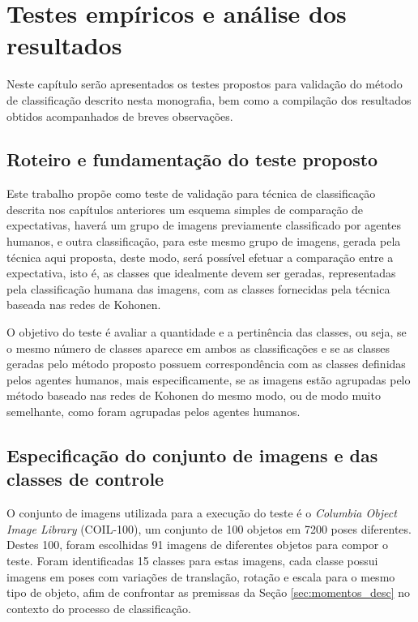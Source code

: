 \chapter{Testes empíricos e análise dos resultados}

Neste capítulo serão apresentados os testes propostos para validação do método
de classificação descrito nesta monografia, bem como a compilação dos
resultados obtidos acompanhados de breves observações.

\section{Roteiro e fundamentação do teste proposto}

Este trabalho propõe como teste de validação para técnica de classificação
descrita nos capítulos anteriores um esquema simples de comparação de
expectativas, haverá um grupo de imagens previamente classificado por agentes
humanos, e outra classificação, para este mesmo grupo de imagens, gerada pela
técnica aqui proposta, deste modo, será possível efetuar a comparação entre a
expectativa, isto é, as classes que idealmente devem ser geradas, representadas
pela classificação humana das imagens, com as classes fornecidas pela técnica
baseada nas redes de Kohonen.

O objetivo do teste é avaliar a quantidade e a pertinência das classes, ou seja,
se o mesmo número de classes aparece em ambos as classificações e se as classes
geradas pelo método proposto possuem correspondência com as classes definidas
pelos agentes humanos, mais especificamente, se as imagens estão agrupadas pelo
método baseado nas redes de Kohonen do mesmo modo, ou de modo muito semelhante,
como foram agrupadas pelos agentes humanos.

\section{Especificação do conjunto de imagens e das classes de controle}
\label{sec:conjunto_de_imagens}

O conjunto de imagens utilizada para a execução do teste é o
\textit{Columbia Object Image Library} (COIL-100), um conjunto de 100
objetos em 7200 poses
diferentes. Destes 100, foram escolhidas 91 imagens de diferentes objetos para
compor o teste. Foram identificadas 15 classes para estas imagens, cada classe possui
imagens em poses com variações de translação, rotação e escala para o mesmo tipo
de objeto, afim de confrontar as premissas da Seção \ref{sec:momentos_desc} no
contexto do processo de classificação.

